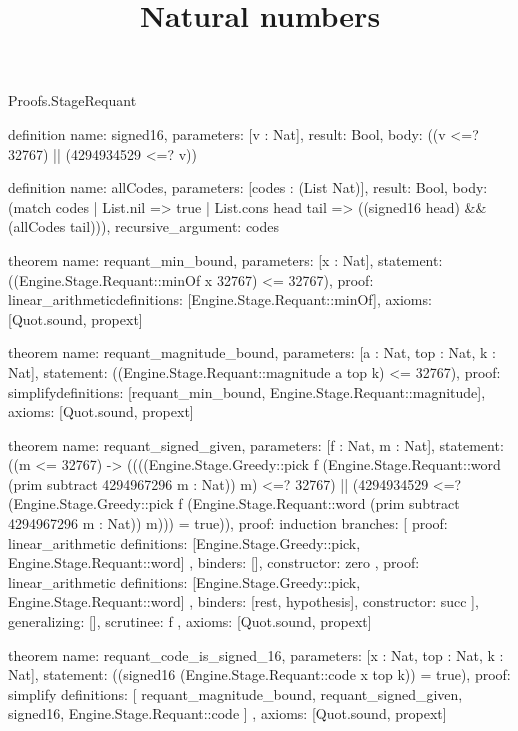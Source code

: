 \begin{lexlean}{Proofs.StageRequant}
\title{Natural numbers}
\begin{semanticmodule}
definition{
  name: signed16,
  parameters: [v : Nat],
  result: Bool,
  body: ((v <=? 32767) || (4294934529 <=? v))
}

definition{
  name: allCodes,
  parameters: [codes : (List Nat)],
  result: Bool,
  body: (match codes
    | List.nil => true
    | List.cons head tail => ((signed16 head) && (allCodes tail))),
  recursive_argument: codes
}

theorem{
  name: requant_min_bound,
  parameters: [x : Nat],
  statement: ((Engine.Stage.Requant::minOf x 32767) <= 32767),
  proof: linear_arithmetic{definitions: [Engine.Stage.Requant::minOf]},
  axioms: [Quot.sound, propext]
}

theorem{
  name: requant_magnitude_bound,
  parameters: [a : Nat, top : Nat, k : Nat],
  statement: ((Engine.Stage.Requant::magnitude a top k) <= 32767),
  proof: simplify{definitions: [requant_min_bound, Engine.Stage.Requant::magnitude]},
  axioms: [Quot.sound, propext]
}

theorem{
  name: requant_signed_given,
  parameters: [f : Nat, m : Nat],
  statement: ((m <= 32767) -> ((((Engine.Stage.Greedy::pick f (Engine.Stage.Requant::word (prim subtract 4294967296 m : Nat)) m) <=? 32767) || (4294934529 <=? (Engine.Stage.Greedy::pick f (Engine.Stage.Requant::word (prim subtract 4294967296 m : Nat)) m))) = true)),
  proof: induction{
    branches: [
      {
        proof: linear_arithmetic{
          definitions: [Engine.Stage.Greedy::pick, Engine.Stage.Requant::word]
        },
        binders: [],
        constructor: zero
      },
      {
        proof: linear_arithmetic{
          definitions: [Engine.Stage.Greedy::pick, Engine.Stage.Requant::word]
        },
        binders: [rest, hypothesis],
        constructor: succ
      }
    ],
    generalizing: [],
    scrutinee: f
  },
  axioms: [Quot.sound, propext]
}

theorem{
  name: requant_code_is_signed_16,
  parameters: [x : Nat, top : Nat, k : Nat],
  statement: ((signed16 (Engine.Stage.Requant::code x top k)) = true),
  proof: simplify{
    definitions: [
      requant_magnitude_bound,
      requant_signed_given,
      signed16,
      Engine.Stage.Requant::code
    ]
  },
  axioms: [Quot.sound, propext]
}


\end{semanticmodule}
\end{lexlean}
